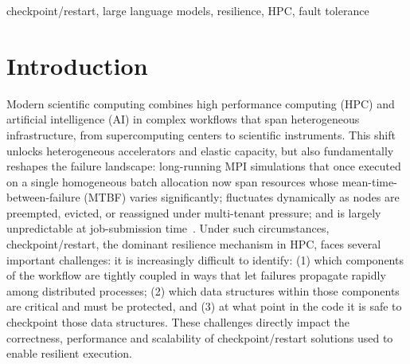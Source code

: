 \documentclass[conference]{IEEEtran}
\begin{document}
\begin{abstract}
Adding reliable checkpoint/restart support to an MPI scientific application is a time-consuming expert effort that requires deep knowledge of both the application and resilience. We ask whether a frontier large language model can perform this work end-to-end without human intervention. We assemble a benchmark suite of MPI applications spanning diverse domains and computation patterns, and drive an iterative code-generation loop for each application using Anthropic's Claude Opus 4.7 invoked through the OpenCode CLI. Across seventeen scientific applications, the LLM generates working checkpoint/restart code in roughly 45~minutes on average while consuming 5.1~M tokens per application. The generated code adds statistically zero overhead during normal failure-free execution on fourteen of seventeen applications ($\pm 2\%$ of original execution time), and recovers from injected process failures with efficiency comparable to human-engineered checkpoint/restart implementations. These results suggest that automated end-to-end LLM-driven resilience engineering is technically viable today for a meaningful fraction of HPC applications.
\end{abstract}

\begin{IEEEkeywords}
checkpoint/restart, large language models, resilience, HPC, fault tolerance
\end{IEEEkeywords}

\section{Introduction}
\label{sec:intro}

Modern scientific computing combines high performance computing (HPC) and
artificial intelligence (AI) in complex workflows that span heterogeneous infrastructure, from supercomputing centers to scientific instruments. This shift unlocks heterogeneous accelerators and elastic capacity, but also fundamentally reshapes the failure landscape: long-running MPI simulations that once executed on a single homogeneous batch allocation now span resources whose mean-time-between-failure (MTBF) varies significantly; fluctuates dynamically as nodes are preempted, evicted, or reassigned under multi-tenant pressure; and is largely unpredictable at job-submission time~\cite{cappello2014toward,Diaspora-Overview-eScience24}. Under such circumstances, checkpoint/restart, the dominant resilience mechanism in HPC, faces several important challenges:
it is increasingly difficult to identify: (1) which components of the workflow are tightly coupled in ways that let failures propagate rapidly among distributed processes; (2) which data structures within those components are critical and must be protected, and (3) at what point in the code it is safe to checkpoint those data structures. These challenges directly impact the correctness, performance and scalability of checkpoint/restart solutions used to enable resilient execution.
\end{document}
